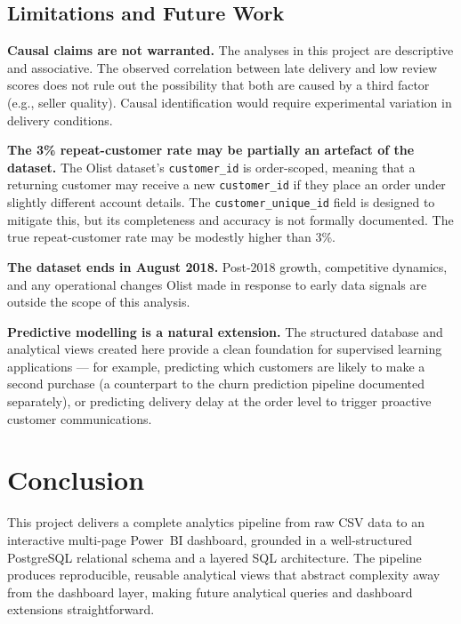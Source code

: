 \documentclass[12pt,a4paper]{article}
\begin{document}
\subsection{Limitations and Future Work}

\textbf{Causal claims are not warranted.} The analyses in this project are descriptive
and associative. The observed correlation between late delivery and low review scores does
not rule out the possibility that both are caused by a third factor (e.g., seller quality).
Causal identification would require experimental variation in delivery conditions.

\textbf{The 3\% repeat-customer rate may be partially an artefact of the dataset.}
The Olist dataset's \texttt{customer\_id} is order-scoped, meaning that a returning customer
may receive a new \texttt{customer\_id} if they place an order under slightly different
account details. The \texttt{customer\_unique\_id} field is designed to mitigate this, but
its completeness and accuracy is not formally documented. The true repeat-customer rate may
be modestly higher than 3\%.

\textbf{The dataset ends in August 2018.} Post-2018 growth, competitive dynamics, and
any operational changes Olist made in response to early data signals are outside the scope
of this analysis.

\textbf{Predictive modelling is a natural extension.} The structured database and
analytical views created here provide a clean foundation for supervised learning
applications — for example, predicting which customers are likely to make a second
purchase (a counterpart to the churn prediction pipeline documented separately), or
predicting delivery delay at the order level to trigger proactive customer communications.

\section{Conclusion}
\label{sec:conclusion}

This project delivers a complete analytics pipeline from raw CSV data to an interactive
multi-page Power~BI dashboard, grounded in a well-structured PostgreSQL relational schema
and a layered SQL architecture. The pipeline produces reproducible, reusable analytical
views that abstract complexity away from the dashboard layer, making future analytical
queries and dashboard extensions straightforward.
\end{document}
